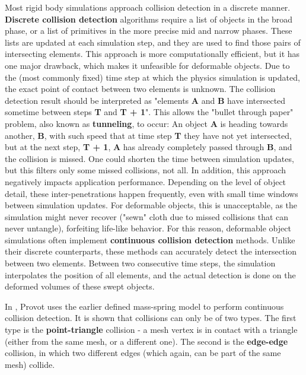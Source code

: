 Most rigid body simulations approach collision detection in a discrete manner. \textbf{Discrete collision detection} algorithms require a list of objects in the broad phase, or a list of primitives in the more precise mid and narrow phases. These lists are updated at each simulation step, and they are used to find those pairs of intersecting elements. This approach is more computationally efficient, but it has one major drawback, which makes it unfeasible for deformable objects. Due to the (most commonly fixed) time step at which the physics simulation is updated, the exact point of contact between two elements is unknown. The collision detection result should be interpreted as "elements \textbf{A} and \textbf{B} have intersected sometime between steps \textbf{T} and \textbf{T + 1}". This allows the "bullet through paper" problem, also known as \textbf{tunneling}, to occur: An object \textbf{A} is heading towards another, \textbf{B}, with such speed that at time step \textbf{T} they have not yet intersected, but at the next step, \textbf{T + 1}, \textbf{A} has already completely passed through \textbf{B}, and the collision is missed. One could shorten the time between simulation updates, but this filters only some missed collisions, not all. In addition, this approach negatively impacts application performance. Depending on the level of object detail, these inter-penetrations happen frequently, even with small time windows between simulation updates. For deformable objects, this is unacceptable, as the simulation might never recover ("sewn" cloth due to missed collisions that can never untangle), forfeiting life-like behavior. For this reason, deformable object simulations often implement \textbf{continuous collision detection} methods. Unlike their discrete counterparts, these methods can accurately detect the intersection between two elements. Between two consecutive time steps, the simulation interpolates the position of all elements, and the actual detection is done on the deformed volumes of these swept objects.

In \citep{provot97}, Provot uses the earlier defined mass-spring model \citep{provot95} to perform continuous collision detection. It is shown that collisions can only be of two types. The first type is the \textbf{point-triangle} collision - a mesh vertex is in contact with a triangle (either from the same mesh, or a different one). The second is the \textbf{edge-edge} collision, in which two different edges (which again, can be part of the same mesh) collide.

